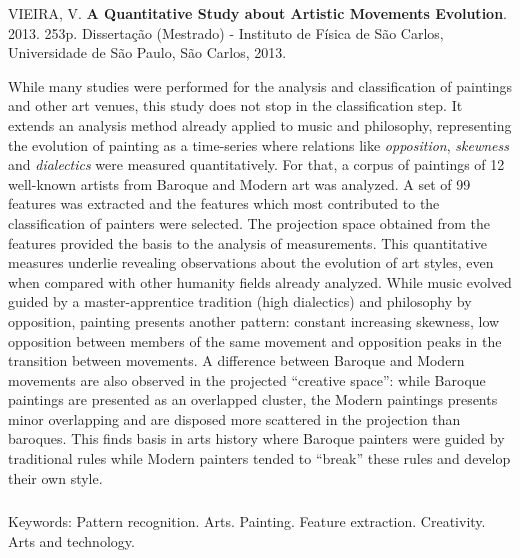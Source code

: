 \afterpage{\blankpage}

\begin{abstract2}
\vspace{-10mm}
VIEIRA, V. \textbf{A Quantitative Study about Artistic Movements Evolution}. 2013. 253p. Dissertação (Mestrado) - Instituto de Física de São Carlos, Universidade de São Paulo, São Carlos, 2013.
\vspace{15mm}

  While many studies were performed for the analysis and classification of
  paintings and other art venues, this study does not stop in the classification
  step. It extends an analysis method already applied to music and philosophy,
  representing the evolution of painting as a time-series where relations like
  \textit{opposition}, \textit{skewness} and \textit{dialectics} were measured
  quantitatively. For that, a corpus of paintings of 12 well-known artists from
  Baroque and Modern art was analyzed. A set of 99 features was extracted and
  the features which most contributed to the classification of painters were
  selected. The projection space obtained from the features provided the basis
  to the analysis of measurements. This quantitative measures underlie revealing
  observations about the evolution of art styles, even when compared with other
  humanity fields already analyzed. While music evolved guided by a
  master-apprentice tradition (high dialectics) and philosophy by opposition,
  painting presents another pattern: constant increasing skewness, low
  opposition between members of the same movement and opposition peaks in the
  transition between movements. A difference between Baroque and Modern
  movements are also observed in the projected ``creative space'': while Baroque
  paintings are presented as an overlapped cluster, the Modern paintings
  presents minor overlapping and are disposed more scattered in the projection
  than baroques. This finds basis in arts history where Baroque painters were
  guided by traditional rules while Modern painters tended to ``break'' these
  rules and develop their own style.

$\phantom{linha em branco}$\\
Keywords: Pattern recognition. Arts. Painting. Feature
extraction. Creativity. Arts and technology.

\end{abstract2}
